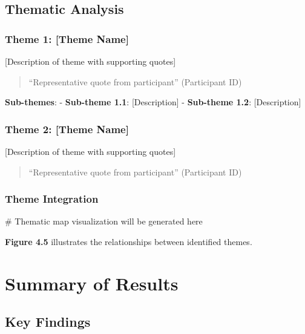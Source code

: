 \documentclass[
  12pt,
  letterpaper,
  12pt,
  letterpaper,
  oneside]{report}
\newenvironment{Shaded}{\begin{snugshade}}{\end{snugshade}}
\newcommand{\CommentTok}[1]{\textcolor[rgb]{0.37,0.37,0.37}{#1}}
\begin{document}
\subsection{Thematic Analysis}\label{thematic-analysis}

\subsubsection{Theme 1: {[}Theme Name{]}}\label{theme-1-theme-name}

{[}Description of theme with supporting quotes{]}

\begin{quote}
``Representative quote from participant'' (Participant ID)
\end{quote}

\textbf{Sub-themes}: - \textbf{Sub-theme 1.1}: {[}Description{]} -
\textbf{Sub-theme 1.2}: {[}Description{]}

\subsubsection{Theme 2: {[}Theme Name{]}}\label{theme-2-theme-name}

{[}Description of theme with supporting quotes{]}

\begin{quote}
``Representative quote from participant'' (Participant ID)
\end{quote}

\subsubsection{Theme Integration}\label{theme-integration}

\begin{Shaded}
\begin{Highlighting}[]
\CommentTok{\# Thematic map visualization will be generated here}
\end{Highlighting}
\end{Shaded}

\textbf{Figure 4.5} illustrates the relationships between identified
themes.

\section{Summary of Results}\label{summary-of-results}

\subsection{Key Findings}\label{key-findings}
\end{document}

